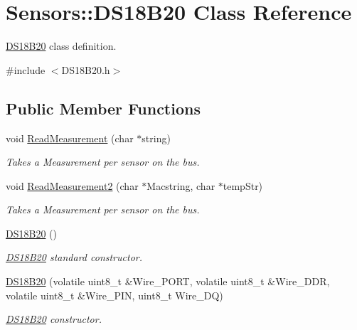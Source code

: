 \hypertarget{classSensors_1_1DS18B20}{}\section{Sensors\+:\+:D\+S18\+B20 Class Reference}
\label{classSensors_1_1DS18B20}


\hyperlink{classSensors_1_1DS18B20}{D\+S18\+B20} class definition.  




{\ttfamily \#include $<$D\+S18\+B20.\+h$>$}

\subsection*{Public Member Functions}
\begin{DoxyCompactItemize}
\item 
void \hyperlink{classSensors_1_1DS18B20_a014be02f21c7f7b7f933fa800213695c}{Read\+Measurement} (char $\ast$string)
\begin{DoxyCompactList}\small\item\em Takes a Measurement per sensor on the bus. \end{DoxyCompactList}\item 
void \hyperlink{classSensors_1_1DS18B20_a9b8098959de0977e4576093fe2346cbd}{Read\+Measurement2} (char $\ast$Macstring, char $\ast$temp\+Str)
\begin{DoxyCompactList}\small\item\em Takes a Measurement per sensor on the bus. \end{DoxyCompactList}\item 
\hyperlink{classSensors_1_1DS18B20_af643f9bc9d0095ec396817630aa9fa19}{D\+S18\+B20} ()
\begin{DoxyCompactList}\small\item\em \hyperlink{classSensors_1_1DS18B20}{D\+S18\+B20} standard constructor. \end{DoxyCompactList}\item 
\hyperlink{classSensors_1_1DS18B20_a4beaec7604e613184572d0175361fba7}{D\+S18\+B20} (volatile uint8\+\_\+t \&Wire\+\_\+\+P\+O\+RT, volatile uint8\+\_\+t \&Wire\+\_\+\+D\+DR, volatile uint8\+\_\+t \&Wire\+\_\+\+P\+IN, uint8\+\_\+t Wire\+\_\+\+DQ)
\begin{DoxyCompactList}\small\item\em \hyperlink{classSensors_1_1DS18B20}{D\+S18\+B20} constructor. \end{DoxyCompactList}\item 

\end{DoxyCompactItemize}
